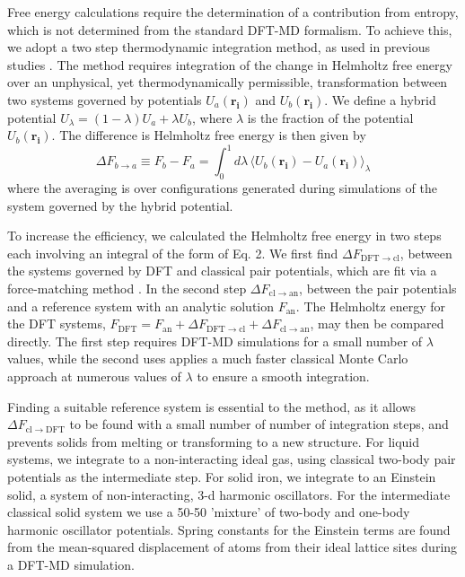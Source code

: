Free energy calculations require the determination of a contribution from
entropy, which is not determined from the standard DFT-MD formalism. To achieve
this, we adopt a two step thermodynamic integration method, as 
used in previous studies \citep{morales09,wilson10,wilson12a,wilson12b}. The method
requires integration of the change in Helmholtz free energy over an
unphysical, yet thermodynamically permissible, transformation between two
systems governed by potentials $U_a\left(\mathbf{r_i}\right)$ and 
$U_b\left(\mathbf{r_i}\right)$. We define a hybrid potential 
$U_{\lambda}=\left(1-\lambda\right)U_a+\lambda U_b$, where $\lambda$ is the
fraction of the potential $U_b\left(\mathbf{r_i}\right)$. The difference is
Helmholtz free energy is then given by
\begin{equation}
  \Delta F_{b\to a}\equiv F_b - F_a = \int_{0}^{1}{d\lambda\,\langle U_b\left(\mathbf{r_i}\right) -
  U_a\left(\mathbf{r_i}\right) \rangle_{\lambda}}
\end{equation}
where the averaging is over configurations generated
during simulations of the system governed by the hybrid potential. 

To increase the efficiency, we calculated the Helmholtz free energy in two steps 
each involving an integral of the form of Eq. 2. We first find $\Delta
F_{\mathrm{DFT}\to \mathrm{cl}}$,
between the systems governed by DFT and classical pair potentials, which are
fit via a force-matching method \citep{izvekov04}. In the second step $\Delta
F_{\mathrm{cl}\to \mathrm{an}}$, between the pair potentials and a reference system with an
analytic solution $F_{\mathrm{an}}$. The Helmholtz energy for the DFT systems,
$F_{\mathrm{DFT}}=F_{\mathrm{\mathrm{an}}}+\Delta F_{\mathrm{DFT}\to \mathrm{cl}}+\Delta F_{\mathrm{cl} \to \mathrm{an}}$, may then be
compared directly. The first step requires DFT-MD simulations for a small
number of $\lambda$ values, while the second uses applies a much faster classical Monte Carlo
approach at numerous values of $\lambda$ to ensure a smooth integration.

Finding a suitable reference system is essential to the method, as it allows
$\Delta F_{\mathrm{cl}\to \mathrm{DFT}}$ to be found with a small number of 
number of integration steps, and prevents solids from melting or transforming to a new
structure. For liquid systems, we integrate to a non-interacting
ideal gas, using classical two-body pair potentials as the intermediate
step. For solid iron, we integrate to an Einstein solid, a system of
non-interacting, 3-d harmonic oscillators. For the intermediate classical
solid system we use a 50-50
'mixture' of two-body and one-body harmonic oscillator potentials. Spring
constants for the Einstein terms are found from the mean-squared displacement 
of atoms from their ideal lattice sites during a DFT-MD simulation. 


